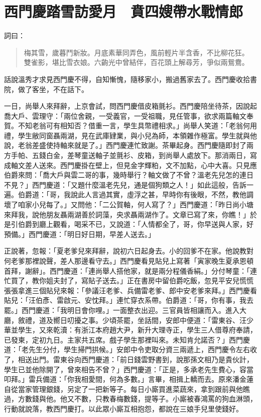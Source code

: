 
\chapter{西門慶踏雪訪愛月　賁四嫂帶水戰情郎}

詞曰：
\begin{quote}
梅其雪，歲暮鬥新妝。月底素華同弄色，風前輕片半含香，不比柳花狂。
雙雀影，堪比雪衣娘。六齣光中曾結伴，百花頭上解尋芳，爭似兩鴛鴦。
\end{quote}

話說溫秀才求見西門慶不得，自知慚愧，隨移家小，搬過舊家去了。西門慶收拾書院，做了客坐，不在話下。

一日，尚舉人來拜辭，上京會試，問西門慶借皮箱氈衫。西門慶陪坐待茶，因說起喬大戶、雲理守：「兩位舍親，一受義官，一受祖職，見任管事，欲求兩篇軸文奉賀。不知老翁可有相知否？借重一言，學生具幣禮相求。」尚舉人笑道：「老翁何用禮，學生敝同窗聶兩湖，見在武庫肄業，與小兒為師，本領雜作極富。學生就與他說，老翁差盛使持軸來就是了。」西門慶連忙致謝。茶畢起身。西門慶隨即封了兩方手帕、五錢白金，差琴童送軸子並氈衫、皮箱，到尚舉人處放下。那消兩日，寫成軸文差人送來。西門慶掛在壁上，但見金字輝粕，文不加點，心中大喜。只見應伯爵來問：「喬大戶與雲二哥的事，幾時舉行？軸文做了不曾？溫老先兒怎的連日不見？」西門慶道：「又題什麼溫老先兒，通是個狗類之人！」如此這般，告訴一遍。伯爵道：「哥，我說此人言過其實，虛浮之甚，早時你有後眼，不然，教他調壞了咱家小兒每了。」又問他：「二公賀軸，何人寫了？」西門慶道：「昨日尚小塘來拜我，說他朋友聶兩湖善於詞藻，央求聶兩湖作了。文章已寫了來，你瞧！」於是引伯爵到廳上觀看，喝采不已，又說道：「人情都全了，哥，你早送與人家，好預備。」西門慶道：「明日好日期，早差人送去。」

正說著，忽報：「夏老爹兒來拜辭，說初六日起身去。小的回爹不在家。他說教對何老爹那裡說聲，差人那邊看守去。」西門慶看見貼兒上寫著「寅家晚生夏承恩頓首拜，謝辭」。西門慶道：「連尚舉人搭他家，就是兩分程儀香絹。」分付琴童：「連忙買了，教你姐夫封了，寫貼子送去。」正在書房中留伯爵吃飯，忽見平安兒慌慌張張拿進三個貼兒來報：「參議汪老爹、兵備雷老爹、郎中安老爹來拜。」西門慶看貼兒：「汪伯彥、雷啟元、安忱拜。」連忙穿衣系帶。伯爵道：「哥，你有事，我去罷。」西門慶道：「我明日會你哩。」一面整衣出迎。三官員皆相讓而入。進入大廳，敘禮，道及嚮日叨擾之事。少頃茶罷，坐話間，安郎中便道：「雷東谷、汪少華並學生，又來乾瀆：有浙江本府趙大尹，新升大理寺正，學生三人借尊府奉請，已發柬，定初九日。主家共五席。戲子學生那裡叫來。未知肯允諾否？」西門慶道：「老先生分付，學生掃門拱候。」安郎中令吏取分資三兩遞上，西門慶令左右收了，相送出門。雷東谷向西門慶道：「前日錢雲野書到，說那孫文相乃是貴伙計，學生已並他除開了，曾來相告不曾？」西門慶道：「正是，多承老先生費心，容當叩拜。」雷兵備道：「你我相愛間，何為多數。」言畢，相揖上轎而去。原來潘金蓮自從當家管理銀錢，另定了一把新等子。每日小廝買進菜蔬來，拿到跟前與他瞧過，方數錢與他。他又不數，只教春梅數錢，提等子。小廝被春鴻罵的狗血淋頭，行動就說落，教西門慶打。以此眾小廝互相抱怨，都說在三娘手兒里使錢好。

